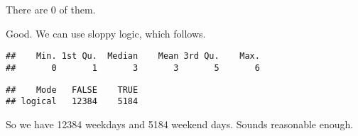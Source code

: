 \documentclass[]{article}
\newenvironment{Shaded}{\begin{snugshade}}{\end{snugshade}}
\newcommand{\KeywordTok}[1]{\textcolor[rgb]{0.13,0.29,0.53}{\textbf{#1}}}
\newcommand{\StringTok}[1]{\textcolor[rgb]{0.31,0.60,0.02}{#1}}
\newcommand{\OperatorTok}[1]{\textcolor[rgb]{0.81,0.36,0.00}{\textbf{#1}}}
\newcommand{\NormalTok}[1]{#1}
\begin{document}
\begin{Shaded}
\end{Shaded}

There are 0 of them.

Good. We can use sloppy logic, which follows.

\begin{Shaded}
\end{Shaded}

\begin{verbatim}
##    Min. 1st Qu.  Median    Mean 3rd Qu.    Max. 
##       0       1       3       3       5       6
\end{verbatim}

\begin{Shaded}
\end{Shaded}

\begin{verbatim}
##    Mode   FALSE    TRUE 
## logical   12384    5184
\end{verbatim}

\begin{Shaded}
\end{Shaded}

So we have 12384 weekdays and 5184 weekend days. Sounds reasonable
enough.
\end{document}
